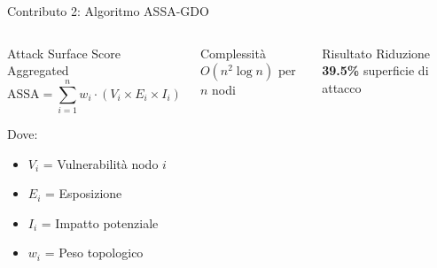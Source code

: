 \documentclass[aspectratio=169,10pt]{beamer}
\begin{document}
\begin{frame}{Contributo 2: Algoritmo ASSA-GDO}
\begin{columns}[T]
\begin{block}{Attack Surface Score Aggregated}
\begin{equation*}
\text{ASSA} = \sum_{i=1}^{n} w_i \cdot \left( V_i \times E_i \times I_i \right)
\end{equation*}

Dove:
\begin{itemize}
    \item $V_i$ = Vulnerabilità nodo $i$
    \item $E_i$ = Esposizione
    \item $I_i$ = Impatto potenziale
    \item $w_i$ = Peso topologico
\end{itemize}
\end{block}

\begin{exampleblock}{Complessità}
$O(n^2 \log n)$ per $n$ nodi
\end{exampleblock}


\begin{alertblock}{Risultato}
Riduzione \textbf{39.5\%} superficie di attacco
\end{alertblock}
\end{columns}
\end{frame}
\end{document}
